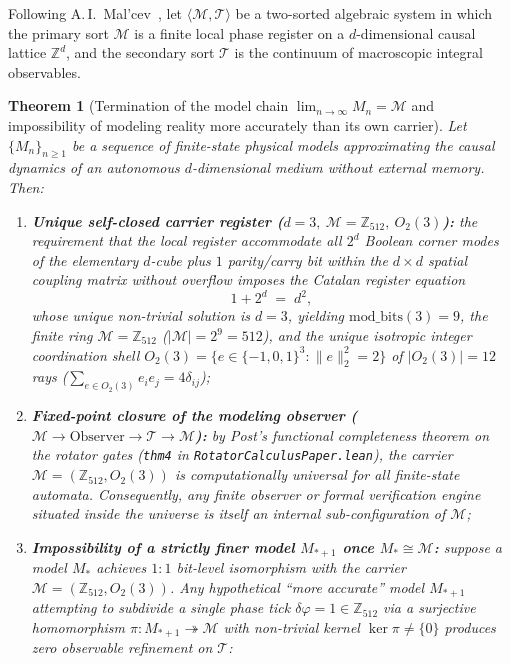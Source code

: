 \documentclass[11pt,a4paper]{article}
\newtheorem{theorem}{Theorem}[section]
\theoremstyle{definition}
\theoremstyle{remark}
\begin{document}
Following A.\,I.~Mal'cev~\cite{Malcev1973}, let $\langle\mathcal{M},\mathcal{T}\rangle$ be a two-sorted algebraic system in which the primary sort $\mathcal{M}$ is a finite local phase register on a $d$-dimensional causal lattice $\mathbb{Z}^d$, and the secondary sort $\mathcal{T}$ is the continuum of macroscopic integral observables.

\begin{theorem}[Termination of the model chain $\lim_{n\to\infty} M_n = \mathcal{M}$ and impossibility of modeling reality more accurately than its own carrier]
\label{thm:model-chain-termination}
Let $\{M_n\}_{n\ge 1}$ be a sequence of finite-state physical models approximating the causal dynamics of an autonomous $d$-dimensional medium without external memory. Then:
\begin{enumerate}[label=\textbf{(\roman*)},leftmargin=*]
\item \textbf{Unique self-closed carrier register ($d=3,\ \mathcal{M}=\mathbb{Z}_{512},\ O_2(3)$):}
  the requirement that the local register accommodate all $2^d$ Boolean corner modes of the elementary $d$-cube plus $1$ parity/carry bit within the $d\times d$ spatial coupling matrix without overflow imposes the Catalan register equation
  \begin{equation}
    \label{eq:catalan-closure}
    1 + 2^d \;=\; d^2,
  \end{equation}
  whose unique non-trivial solution is $d = 3$, yielding $\mathrm{mod\_bits}(3) = 9$, the finite ring $\mathcal{M} = \mathbb{Z}_{512}$ ($|\mathcal{M}| = 2^9 = 512$), and the unique isotropic integer coordination shell $O_2(3) = \{e\in\{-1,0,1\}^3 : \|e\|_2^2 = 2\}$ of $|O_2(3)| = 12$ rays ($\sum_{e\in O_2(3)} e_i e_j = 4\delta_{ij}$);
\item \textbf{Fixed-point closure of the modeling observer ($\mathcal{M} \to \text{Observer} \to \mathcal{T} \to \mathcal{M}$):}
  by Post's functional completeness theorem on the rotator gates (\texttt{thm4} in \texttt{RotatorCalculusPaper.lean}), the carrier $\mathcal{M} = (\mathbb{Z}_{512}, O_2(3))$ is computationally universal for all finite-state automata. Consequently, any finite observer or formal verification engine situated inside the universe is itself an internal sub-configuration of $\mathcal{M}$;
\item \textbf{Impossibility of a strictly finer model $M_{*+1}$ once $M_* \cong \mathcal{M}$:}
  suppose a model $M_*$ achieves $1:1$ bit-level isomorphism with the carrier $\mathcal{M} = (\mathbb{Z}_{512}, O_2(3))$. Any hypothetical ``more accurate'' model $M_{*+1}$ attempting to subdivide a single phase tick $\delta\varphi = 1\in\mathbb{Z}_{512}$ via a surjective homomorphism $\pi : M_{*+1} \twoheadrightarrow \mathcal{M}$ with non-trivial kernel $\ker\pi \ne \{0\}$ produces zero observable refinement on $\mathcal{T}$:

\end{enumerate}
\end{theorem}
\end{document}
